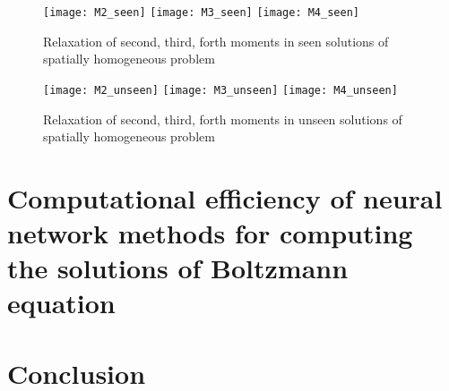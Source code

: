 \documentclass{article}
\begin{document}
\begin{figure}[h]
	\texttt{[image: M2\_seen]}
	\hfill
	\texttt{[image: M3\_seen]}
	\hfill
	\texttt{[image: M4\_seen]}
	\caption{Relaxation of second, third, forth moments in seen solutions of spatially homogeneous problem}
	\label{fig:Moments_seen}	
\end{figure}

\begin{figure}[h]
	\texttt{[image: M2\_unseen]}
	\hfill
	\texttt{[image: M3\_unseen]}
	\hfill
	\texttt{[image: M4\_unseen]}
	\caption{Relaxation of second, third, forth moments in unseen solutions of spatially homogeneous problem}
	\label{fig:Moments_unseen}	
\end{figure}

\section{Computational efficiency of neural network methods for computing the solutions of Boltzmann equation } \label{Comparisons}

\section{Conclusion} \label{Conclusion}

\appendix
\appendixpage
\end{document}
